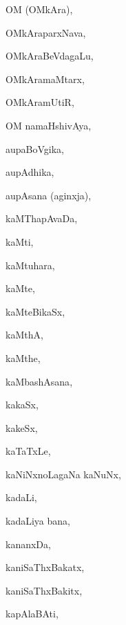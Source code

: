 \begin{multicols}{3}
{\bigskip
\noindent
{}
\smallskip

\noindent
{OM (OMkAra)}, \pageref{OM (OMkAra)}

\noindent
{OMkAraparxNava}, \pageref{OMkAraparxNava}

\noindent
{OMkAraBeVdagaLu}, \pageref{OMkAraBeVdagaLu}

\noindent
{OMkAramaMtarx}, \pageref{OMkAramaMtarx}

\noindent
{OMkAramUtiR}, \pageref{OMkAramUtiR}

\noindent
{OM namaHshivAya}, \pageref{OM namaHshivAya}

\bigskip
\noindent
{}
\smallskip

\noindent
{aupaBoVgika}, \pageref{aupaBoVgika}

\noindent
{aupAdhika}, \pageref{aupAdhika}

\noindent
{aupAsana (aginxja)}, \pageref{aupAsana (aginxja)}

\bigskip
\noindent
{}
\smallskip

\noindent
{kaMThapAvaDa}, \pageref{kaMThapAvaDa}

\noindent
{kaMti}, \pageref{kaMti}

\noindent
{kaMtuhara}, \pageref{kaMtuhara}

\noindent
{kaMte}, \pageref{kaMte}

\noindent
{kaMteBikaSx}, \pageref{kaMteBikaSx}

\noindent
{kaMthA}, \pageref{kaMthA}

\noindent
{kaMthe}, \pageref{kaMthe}

\noindent
{kaMbashAsana}, \pageref{kaMbashAsana}

\noindent
{kakaSx}, \pageref{kakaSx}

\noindent
{kakeSx}, \pageref{kakeSx}

\noindent
{kaTaTxLe}, \pageref{kaTaTxLe}

\noindent
{kaNiNxnoLagaNa kaNuNx}, \pageref{kaNiNxnoLagaNa kaNuNx}

\noindent
{kadaLi}, \pageref{kadaLi}

\noindent
{kadaLiya bana}, \pageref{kadaLiya bana}

\noindent
{kananxDa}, \pageref{kananxDa}

\noindent
{kaniSaThxBakatx}, \pageref{kaniSaThxBakatx}

\noindent
{kaniSaThxBakitx}, \pageref{kaniSaThxBakitx}

\noindent
{kapAlaBAti}, \pageref{kapAlaBAti}

}
\end{multicols}
